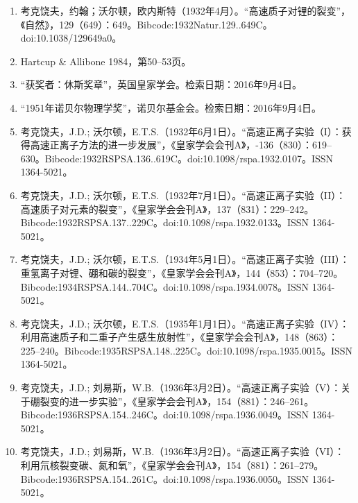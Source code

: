 \begin{enumerate}
\item 考克饶夫，约翰；沃尔顿，欧内斯特（1932年4月）。“高速质子对锂的裂变”，《自然》，129（649）：649。Bibcode:1932Natur.129..649C。doi:10.1038/129649a0。
\item Hartcup & Allibone 1984，第50–53页。
\item “获奖者：休斯奖章”，英国皇家学会。检索日期：2016年9月4日。
\item “1951年诺贝尔物理学奖”，诺贝尔基金会。检索日期：2016年9月4日。
\item 考克饶夫，J.D.; 沃尔顿，E.T.S.（1932年6月1日）。“高速正离子实验（I）：获得高速正离子方法的进一步发展”，《皇家学会会刊A》，-136（830）：619–630。Bibcode:1932RSPSA.136..619C。doi:10.1098/rspa.1932.0107。ISSN 1364-5021。
\item 考克饶夫，J.D.; 沃尔顿，E.T.S.（1932年7月1日）。“高速正离子实验（II）：高速质子对元素的裂变”，《皇家学会会刊A》，137（831）：229–242。Bibcode:1932RSPSA.137..229C。doi:10.1098/rspa.1932.0133。ISSN 1364-5021。
\item 考克饶夫，J.D.; 沃尔顿，E.T.S.（1934年5月1日）。“高速正离子实验（III）：重氢离子对锂、硼和碳的裂变”，《皇家学会会刊A》，144（853）：704–720。Bibcode:1934RSPSA.144..704C。doi:10.1098/rspa.1934.0078。ISSN 1364-5021。
\item 考克饶夫，J.D.; 沃尔顿，E.T.S.（1935年1月1日）。“高速正离子实验（IV）：利用高速质子和二重子产生感生放射性”，《皇家学会会刊A》，148（863）：225–240。Bibcode:1935RSPSA.148..225C。doi:10.1098/rspa.1935.0015。ISSN 1364-5021。
\item 考克饶夫，J.D.; 刘易斯，W.B.（1936年3月2日）。“高速正离子实验（V）：关于硼裂变的进一步实验”，《皇家学会会刊A》，154（881）：246–261。Bibcode:1936RSPSA.154..246C。doi:10.1098/rspa.1936.0049。ISSN 1364-5021。
\item 考克饶夫，J.D.; 刘易斯，W.B.（1936年3月2日）。“高速正离子实验（VI）：利用氘核裂变碳、氮和氧”，《皇家学会会刊A》，154（881）：261–279。Bibcode:1936RSPSA.154..261C。doi:10.1098/rspa.1936.0050。ISSN 1364-5021。
\end{enumerate}